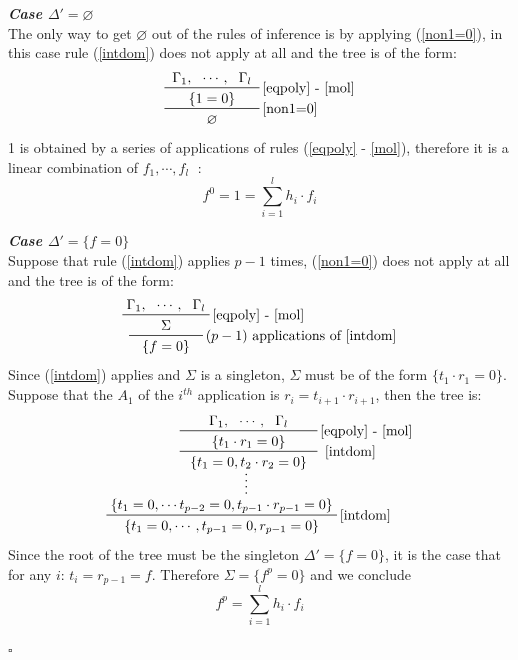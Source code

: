 \documentclass[a4paper,12pt,twoside]{book}
\newcommand*{\QED}{\hfill\ensuremath{\square}}
\let\emptyset\varnothing
\let\o\vee
\begin{document}
\textbf{\emph{Case $\Delta '=\emptyset$}} \\
The only way to get $\emptyset$ out of the rules of inference is by applying (\ref{non1=0}), in this case rule (\ref{intdom}) does not apply at all and the tree is of the form: 
$$
\prftree[r]{\ref{non1=0}}
{ \prftree[r]{\ref{eqpoly} - \ref{mol}}
{ \Gamma_1, }{\cdots ,}{\Gamma_l}
{\hspace{5mm}\{1=0\}\hspace{5mm}	} 
}
{\emptyset }
$$
1 is obtained by a series of applications of rules (\ref{eqpoly} - \ref{mol}), therefore it is a linear  combination of $f_1,\cdots ,f_l\;$ : 
$$f^0=1 = \sum_{i=1}^l h_i \cdot f_i$$


\textbf{\emph{Case $\Delta '=\{f=0\}$ }} \\
Suppose that rule (\ref{intdom}) applies $p-1$ times, (\ref{non1=0}) does not apply at all and the tree is of the form:
$$
\prftree[r]{$(p-1)$ applications of \ref{intdom}}
{ \prftree[r]{\ref{eqpoly} - \ref{mol}}
{ \Gamma_1, }{\cdots ,}{\Gamma_l}
{\hspace{7mm}\Sigma\hspace{7mm}	} 
}
{\{f=0\} }
$$
Since (\ref{intdom}) applies and $\Sigma$ is a singleton, $\Sigma$ must be of the form $ \{ t_1 \cdot r_1 =0 \}$. Suppose that the $A_1$ of the $i^{th}$ application is $r_i=t_{i+1}\cdot r_{i+1}$, then the tree is:
$$
\prfsummary{
\prftree[r]{ \ref{intdom}}
{ \prftree[r]{\ref{eqpoly} - \ref{mol}}
{ \Gamma_1, }{\cdots ,}{\Gamma_l}
{\hspace{7mm}\{t_1 \cdot r_1=0\}\hspace{7mm}	} 
}
{\{ t_1=0, t_2 \cdot r_2=0\} }
}
{\prftree[r]{\ref{intdom}}
{\{ t_1=0,\cdots t_{p-2}=0, t_{p-1}\cdot r_{p-1}=0\}  }
{\{ t_1=0,\cdots ,t_{p-1}=0,r_{p-1}=0\}}
}
$$
Since the root of the tree must be the singleton $\Delta '=\{f=0\}$, it is the case that for any $i$: $t_i=r_{p-1}=f $.
Therefore $\Sigma= \{ f^p =0 \}$ and we conclude 
$$f^p = \sum_{i=1}^l h_i \cdot f_i $$


\QED
%
%
%
%
%
%
\end{document}
